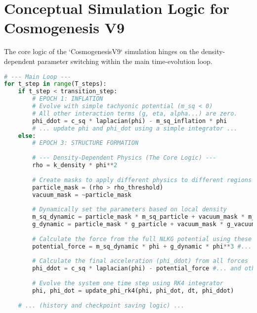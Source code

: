 \documentclass[11pt, twoside]{article}
\begin{document}
\appendix
\section{Conceptual Simulation Logic for Cosmogenesis V9}
The core logic of the `CosmogenesisV9` simulation hinges on the density-dependent parameter switching within the main time-evolution loop.

\begin{lstlisting}[language=Python, caption={Conceptual Simulation Logic for EFM Cosmogenesis}, label=lst:cosmo_code]
# --- Main Loop ---
for t_step in range(T_steps):
    if t_step < transition_step:
        # EPOCH 1: INFLATION
        # Evolve with simple tachyonic potential (m_sq < 0)
        # All other interaction terms (g, eta, alpha...) are zero.
        phi_ddot = c_sq * laplacian(phi) - m_sq_inflation * phi
        # ... update phi and phi_dot using a simple integrator ...
    else:
        # EPOCH 3: STRUCTURE FORMATION
        
        # --- Density-Dependent Physics (The Core Logic) ---
        rho = k_density * phi**2
        
        # Create masks to apply different physics to different regions
        particle_mask = (rho > rho_threshold)
        vacuum_mask = ~particle_mask
        
        # Dynamically set the parameters based on local density
        m_sq_dynamic = particle_mask * m_sq_particle + vacuum_mask * m_sq_vacuum
        g_dynamic = particle_mask * g_particle + vacuum_mask * g_vacuum
        
        # Calculate the force from the full NLKG potential using these dynamic parameters
        potential_force = m_sq_dynamic * phi + g_dynamic * phi**3 #... and other terms
        
        # Calculate the final acceleration (phi_ddot) from all forces
        phi_ddot = c_sq * laplacian(phi) - potential_force #... and other interaction terms
        
        # Evolve the system one time step using RK4 integrator
        phi, phi_dot = update_phi_rk4(phi, phi_dot, dt, phi_ddot)
        
    # ... (history and checkpoint saving logic) ...
\end{lstlisting}
\end{document}
